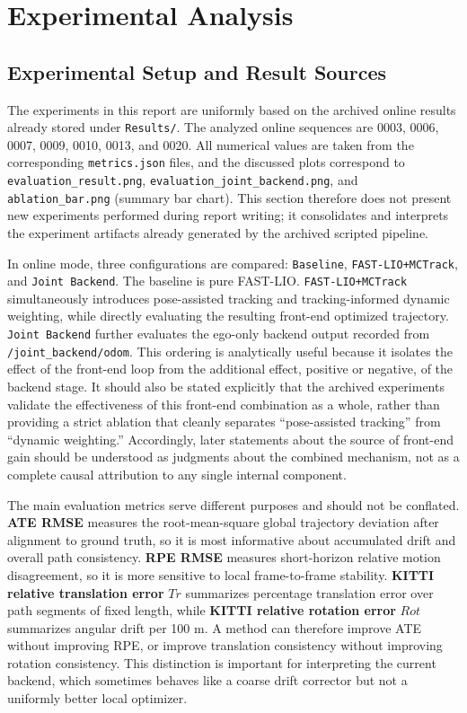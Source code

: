 \documentclass[a4paper,12pt]{article}
\begin{document}
\section{Experimental Analysis}
\subsection{Experimental Setup and Result Sources}
The experiments in this report are uniformly based on the archived online results already stored under \texttt{Results/}. The analyzed online sequences are 0003, 0006, 0007, 0009, 0010, 0013, and 0020. All numerical values are taken from the corresponding \texttt{metrics.json} files, and the discussed plots correspond to \texttt{evaluation\_result.png}, \texttt{evaluation\_joint\_backend.png}, and \texttt{ablation\_bar.png} (summary bar chart). This section therefore does not present new experiments performed during report writing; it consolidates and interprets the experiment artifacts already generated by the archived scripted pipeline.

In online mode, three configurations are compared: \texttt{Baseline}, \texttt{FAST-LIO+MCTrack}, and \texttt{Joint Backend}. The baseline is pure FAST-LIO. \texttt{FAST-LIO+MCTrack} simultaneously introduces pose-assisted tracking and tracking-informed dynamic weighting, while directly evaluating the resulting front-end optimized trajectory. \texttt{Joint Backend} further evaluates the ego-only backend output recorded from \texttt{/joint\_backend/odom}. This ordering is analytically useful because it isolates the effect of the front-end loop from the additional effect, positive or negative, of the backend stage. It should also be stated explicitly that the archived experiments validate the effectiveness of this front-end combination as a whole, rather than providing a strict ablation that cleanly separates ``pose-assisted tracking'' from ``dynamic weighting.'' Accordingly, later statements about the source of front-end gain should be understood as judgments about the combined mechanism, not as a complete causal attribution to any single internal component.

The main evaluation metrics serve different purposes and should not be conflated. \textbf{ATE RMSE} measures the root-mean-square global trajectory deviation after alignment to ground truth, so it is most informative about accumulated drift and overall path consistency. \textbf{RPE RMSE} measures short-horizon relative motion disagreement, so it is more sensitive to local frame-to-frame stability. \textbf{KITTI relative translation error} \(Tr\) summarizes percentage translation error over path segments of fixed length, while \textbf{KITTI relative rotation error} \(Rot\) summarizes angular drift per 100 m. A method can therefore improve ATE without improving RPE, or improve translation consistency without improving rotation consistency. This distinction is important for interpreting the current backend, which sometimes behaves like a coarse drift corrector but not a uniformly better local optimizer.
\end{document}
